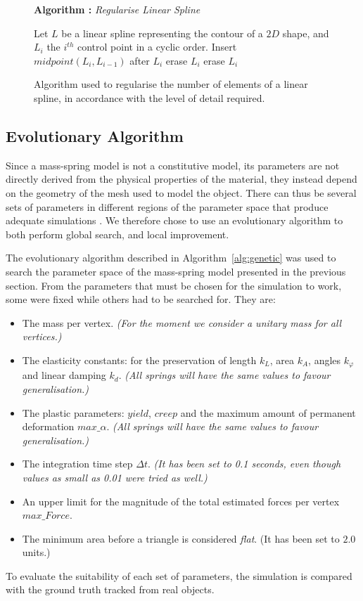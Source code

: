 \documentclass[journal]{IEEEtran}
\newcommand{\alref}[1]{Algorithm~\ref{#1}}
\newcounter{algorithm}
\newenvironment{algorithmicieee}[1]
  {\refstepcounter{algorithm}
   \begin{lrbox}{\ieeealgbox}
   \begin{minipage}{\dimexpr\columnwidth-2\fboxsep-2\fboxrule}
   \textbf{Algorithm \arabic{algorithm}:} \textit{#1} \par
   \begin{algorithmic}[1]}
  {\end{algorithmic}
   \end{minipage}
   \end{lrbox}\noindent\fbox{\usebox{\ieeealgbox}}}
\newcommand{\comment}[1]{{\color{red} #1}}
\begin{document}
\begin{figure}
 \begin{algorithmicieee}{Regularise Linear Spline}\label{alg:regularise}
 \STATE Let $L$ be a linear spline representing the contour of a $2D$ shape, and $L_i$ the $i^{th}$ control point in a cyclic order.
  \STATE Insert $midpoint(L_i,L_{i-1})$ after $L_i$
  \STATE erase $L_i$
  \STATE erase $L_i$
 \ENDIF
 \ENDFOR
\end{algorithmicieee}
\caption{Algorithm used to regularise the number of elements of a linear spline, in accordance with the level of detail required.}
\end{figure}


\subsection{Evolutionary Algorithm}
\comment{Since a mass-spring model is not a constitutive model, its parameters are not directly derived from the physical properties of the material, they instead depend on the geometry of the mesh used to model the object. There can thus be several sets of parameters in different regions of the parameter space that produce adequate simulations \cite{Morris2008}. We therefore chose to use an evolutionary algorithm to both perform global search, and local improvement.}

The evolutionary algorithm described in \alref{alg:genetic} was used to search the parameter space of the mass-spring model presented in the previous section.
From the parameters that must be chosen for the simulation to work, some were fixed while others had to be searched for.  They are:
\begin{itemize}
 \item The mass per vertex.  \textit{(For the moment we consider a unitary mass for all vertices.)}
 \item The elasticity constants: for the preservation of length $k_L$, area $k_A$, angles $k_{\varphi}$ and linear damping $k_d$.  \textit{(All springs will have the same values to favour generalisation.)}
 \item The plastic parameters: $yield$, $creep$ and the maximum amount of permanent deformation $max\_\alpha$.  \textit{(All springs will have the same values to favour generalisation.)}
 \item The integration time step $\Delta t$.  \textit{(It has been set to 0.1 seconds, even though values as small as 0.01 were tried as well.)}
 \item An upper limit for the magnitude of the total estimated forces per vertex $max\_Force$.
 \item The minimum area before a triangle is considered \textit{flat}.  (It has been set to $2.0$ units.)
\end{itemize}
To evaluate the suitability of each set of parameters, the simulation is compared with the ground truth tracked from real objects.
\end{document}

